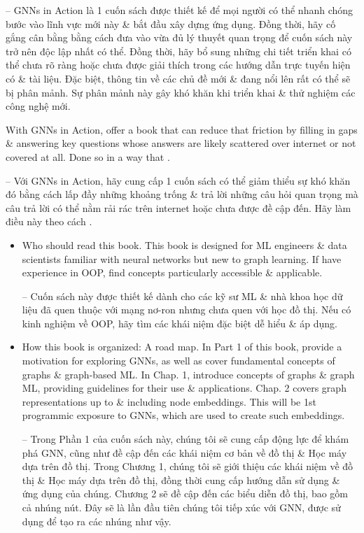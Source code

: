 \documentclass{article}
\begin{document}
\begin{itemize}
    -- GNNs in Action là 1 cuốn sách được thiết kế để mọi người có thể nhanh chóng bước vào lĩnh vực mới này \& bắt đầu xây dựng ứng dụng. Đồng thời, hãy cố gắng cân bằng bằng cách đưa vào vừa đủ lý thuyết quan trọng để cuốn sách này trở nên độc lập nhất có thể. Đồng thời, hãy bổ sung những chi tiết triển khai có thể chưa rõ ràng hoặc chưa được giải thích trong các hướng dẫn trực tuyến hiện có \& tài liệu. Đặc biệt, thông tin về các chủ đề mới \& đang nổi lên rất có thể sẽ bị phân mảnh. Sự phân mảnh này gây khó khăn khi triển khai \& thử nghiệm các công nghệ mới.

    With GNNs in Action, offer a book that can reduce that friction by filling in gaps \& answering key questions whose answers are likely scattered over internet or not covered at all. Done so in a way that .

    -- Với GNNs in Action, hãy cung cấp 1 cuốn sách có thể giảm thiểu sự khó khăn đó bằng cách lấp đầy những khoảng trống \& trả lời những câu hỏi quan trọng mà câu trả lời có thể nằm rải rác trên internet hoặc chưa được đề cập đến. Hãy làm điều này theo cách .
    \begin{itemize}
        \item {\sf Who should read this book.} This book is designed for ML engineers \& data scientists familiar with neural networks but new to graph learning. If have experience in OOP, find concepts particularly accessible \& applicable.

        -- Cuốn sách này được thiết kế dành cho các kỹ sư ML \& nhà khoa học dữ liệu đã quen thuộc với mạng nơ-ron nhưng chưa quen với học đồ thị. Nếu có kinh nghiệm về OOP, hãy tìm các khái niệm đặc biệt dễ hiểu \& áp dụng.
        \item {\sf How this book is organized: A road map.} In Part 1 of this book, provide a motivation for exploring GNNs, as well as cover fundamental concepts of graphs \& graph-based ML. In Chap. 1, introduce concepts of graphs \& graph ML, providing guidelines for their use \& applications. Chap. 2 covers graph representations up to \& including node embeddings. This will be 1st programmic exposure to GNNs, which are used to create such embeddings.

        -- Trong Phần 1 của cuốn sách này, chúng tôi sẽ cung cấp động lực để khám phá GNN, cũng như đề cập đến các khái niệm cơ bản về đồ thị \& Học máy dựa trên đồ thị. Trong Chương 1, chúng tôi sẽ giới thiệu các khái niệm về đồ thị \& Học máy dựa trên đồ thị, đồng thời cung cấp hướng dẫn sử dụng \& ứng dụng của chúng. Chương 2 sẽ đề cập đến các biểu diễn đồ thị, bao gồm cả nhúng nút. Đây sẽ là lần đầu tiên chúng tôi tiếp xúc với GNN, được sử dụng để tạo ra các nhúng như vậy.


\end{itemize}
\end{itemize}
\end{document}
